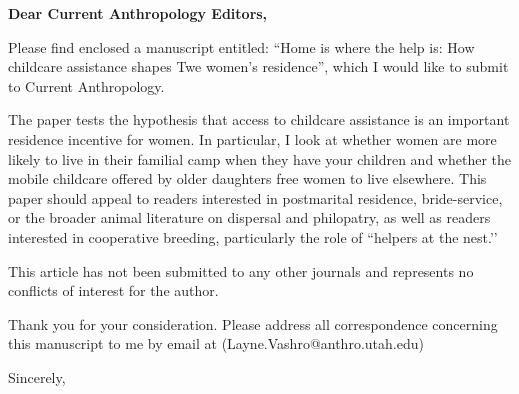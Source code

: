 \documentclass{letter}
\begin{document}

\begin{letter}{} %


\opening{\textbf{Dear Current Anthropology Editors,}}
 
Please find enclosed a manuscript entitled: “Home is where the help is: How childcare assistance shapes Twe women's residence”, which I would like to submit to Current Anthropology.
 
The paper tests the hypothesis that access to childcare assistance is an important residence incentive for women. In particular, I look at whether women are more likely to live in their familial camp when they have your children and whether the mobile childcare offered by older daughters free women to live elsewhere.  This paper should appeal to readers interested in postmarital residence, bride-service, or the broader animal literature on dispersal and philopatry, as well as readers interested in cooperative breeding, particularly the role of ``helpers at the nest.’’
 
This article has not been submitted to any other journals and represents no conflicts of interest for the author.

Thank you for your consideration.  Please address all correspondence concerning this manuscript to me by email at (Layne.Vashro@anthro.utah.edu)


\vspace{2\parskip} %
\closing{Sincerely,\\
 \\
}




\end{letter}
 
\end{document}
